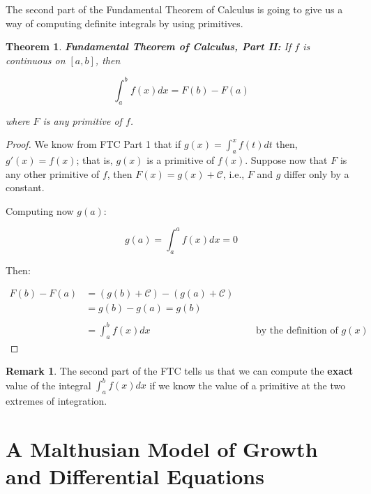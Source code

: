 \documentclass[a4paper,11pt]{article}
\theoremstyle{definition}
\newtheorem{remark}{Remark}
\theoremstyle{plain}
\newtheorem{theorem}{Theorem}
\begin{document}
The second part of the Fundamental Theorem of Calculus is going to give us a way of computing definite integrals by using primitives.

\begin{theorem}{\textbf{Fundamental Theorem of Calculus, Part II:}} If \(f\) is
continuous on \([a,b]\), then

\[
\int^b_a f(x) dx = F(b) -  F(a)
\]

where \(F\) is any primitive of \(f\).
\end{theorem}

\begin{proof}
We know from FTC Part 1 that if \(g(x) = \int^x_a f(t) dt\) then, \(g'(x) = f(x)\); that is, \(g(x)\) is a primitive of \(f(x)\). Suppose now that \(F\) is any other primitive
of \(f\), then \(F(x) = g(x) + \mathcal{C}\), i.e., \(F\) and \(g\) differ only by a constant.

Computing now \(g(a)\):

\[
g(a) = \int^a_a f(x) dx = 0
\]

Then:

\begin{align*}
F(b) - F(a) & = \left(g(b)+\mathcal{C}\right) - \left(g(a)+\mathcal{C}\right)  \ & \ & \ \\
& = g(b) - g(a) = g(b) \ & \ & \  \\ \\
& = \int^b_a f(x) dx \ & \ & \ \text{by the definition of $g(x)$} 
\end{align*}
\end{proof}

\begin{remark}
The second part of the FTC tells us that we can compute the \textbf{exact} value of the integral \(\int^b_a f(x) dx\) if we know the value of a primitive at the two extremes of integration.
\end{remark}

\section{A Malthusian Model of Growth and Differential Equations}\label{a-malthusian-model-of-growth-and-differential-equations}
\end{document}
